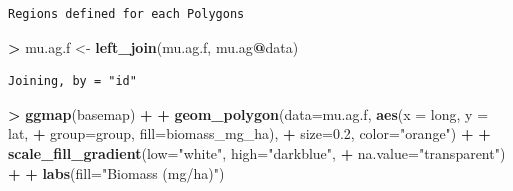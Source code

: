 \documentclass[
]{krantz}
\makeatletter
\newenvironment{Shaded}{\begin{snugshade}}{\end{snugshade}}
\newcommand{\DataTypeTok}[1]{\textcolor[rgb]{0.27,0.27,0.27}{#1}}
\newcommand{\ErrorTok}[1]{\textcolor[rgb]{0.14,0.14,0.14}{\textbf{#1}}}
\newcommand{\FloatTok}[1]{\textcolor[rgb]{0.06,0.06,0.06}{#1}}
\newcommand{\KeywordTok}[1]{\textcolor[rgb]{0.27,0.27,0.27}{\textbf{#1}}}
\newcommand{\NormalTok}[1]{#1}
\newcommand{\OperatorTok}[1]{\textcolor[rgb]{0.43,0.43,0.43}{\textbf{#1}}}
\newcommand{\StringTok}[1]{\textcolor[rgb]{0.5,0.5,0.5}{#1}}
\newenvironment{kframe}{%
\medskip{}
\setlength{\fboxsep}{.8em}
 \def\at@end@of@kframe{}%
 \ifinner\ifhmode%
  \def\at@end@of@kframe{\end{minipage}}%
  \begin{minipage}{\columnwidth}%
 \fi\fi%
 \def\FrameCommand##1{\hskip\@totalleftmargin \hskip-\fboxsep
 \colorbox{shadecolor}{##1}\hskip-\fboxsep
     \hskip-\linewidth \hskip-\@totalleftmargin \hskip\columnwidth}%
 \MakeFramed {\advance\hsize-\width
   \@totalleftmargin\z@ \linewidth\hsize
   \@setminipage}}%
 {\par\unskip\endMakeFramed%
 \at@end@of@kframe}
\renewenvironment{Shaded}{\begin{kframe}}{\end{kframe}}
\makeatother
\begin{document}
\begin{Shaded}
\end{Shaded}

\begin{verbatim}
Regions defined for each Polygons
\end{verbatim}

\begin{Shaded}
\begin{Highlighting}[]
\OperatorTok{\textgreater{}}\StringTok{ }\NormalTok{mu.ag.f \textless{}{-}}\StringTok{ }\KeywordTok{left\_join}\NormalTok{(mu.ag.f, mu.ag}\OperatorTok{@}\NormalTok{data)}
\end{Highlighting}
\end{Shaded}

\begin{verbatim}
Joining, by = "id"
\end{verbatim}

\begin{Shaded}
\begin{Highlighting}[]
\OperatorTok{\textgreater{}}\StringTok{ }\KeywordTok{ggmap}\NormalTok{(basemap) }\OperatorTok{+}
\OperatorTok{+}\StringTok{     }\KeywordTok{geom\_polygon}\NormalTok{(}\DataTypeTok{data=}\NormalTok{mu.ag.f, }\KeywordTok{aes}\NormalTok{(}\DataTypeTok{x =}\NormalTok{ long, }\DataTypeTok{y =}\NormalTok{ lat, }
\OperatorTok{+}\StringTok{                                 }\DataTypeTok{group=}\NormalTok{group, }\DataTypeTok{fill=}\NormalTok{biomass\_mg\_ha), }
\OperatorTok{+}\StringTok{                  }\DataTypeTok{size=}\FloatTok{0.2}\NormalTok{, }\DataTypeTok{color=}\StringTok{"orange"}\NormalTok{) }\OperatorTok{+}
\OperatorTok{+}\StringTok{     }\KeywordTok{scale\_fill\_gradient}\NormalTok{(}\DataTypeTok{low=}\StringTok{"white"}\NormalTok{, }\DataTypeTok{high=}\StringTok{"darkblue"}\NormalTok{, }
\OperatorTok{+}\StringTok{                         }\DataTypeTok{na.value=}\StringTok{"transparent"}\NormalTok{) }\OperatorTok{+}
\OperatorTok{+}\StringTok{     }\KeywordTok{labs}\NormalTok{(}\DataTypeTok{fill=}\StringTok{"Biomass (mg/ha)"}\NormalTok{)}
\end{Highlighting}
\end{Shaded}
\end{document}
